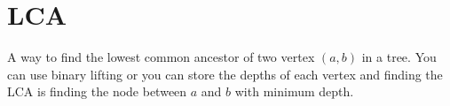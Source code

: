     
    \section{LCA}
    A way to find the lowest common ancestor of two vertex $(a,b)$ in a tree. You can use binary lifting or you can store the depths of each vertex and finding the LCA is finding the node between $a$ and $b$ with minimum depth.
